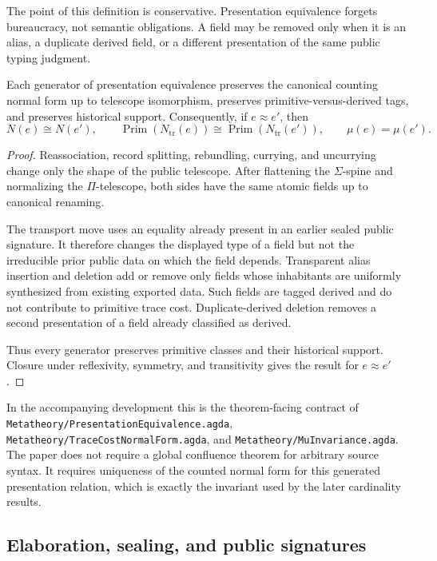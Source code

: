 The point of this definition is conservative.  Presentation equivalence forgets bureaucracy,
not semantic obligations.  A field may be removed only when it is an alias, a duplicate
derived field, or a different presentation of the same public typing judgment.

\begin{proposition}
Each generator of presentation equivalence preserves the canonical counting normal form up to
telescope isomorphism, preserves primitive-versus-derived tags, and preserves historical
support.  Consequently, if \(e\approx e'\), then
\[
  N(e) \cong N(e'),
  \qquad
  \operatorname{Prim}(N_{\mathrm{tr}}(e)) \cong
  \operatorname{Prim}(N_{\mathrm{tr}}(e')),
  \qquad
  \mu(e)=\mu(e').
\]
\end{proposition}

\begin{proof}
Reassociation, record splitting, rebundling, currying, and uncurrying change only the shape of
the public telescope.  After flattening the \(\Sigma\)-spine and normalizing the
\(\Pi\)-telescope, both sides have the same atomic fields up to canonical renaming.

The transport move uses an equality already present in an earlier sealed public signature.
It therefore changes the displayed type of a field but not the irreducible prior public data
on which the field depends.  Transparent alias insertion and deletion add or remove only
fields whose inhabitants are uniformly synthesized from existing exported data.  Such fields
are tagged derived and do not contribute to primitive trace cost.  Duplicate-derived deletion
removes a second presentation of a field already classified as derived.

Thus every generator preserves primitive classes and their historical support.  Closure under
reflexivity, symmetry, and transitivity gives the result for \(e\approx e'\).
\end{proof}

In the accompanying development this is the theorem-facing contract of
\texttt{Metatheory/PresentationEquivalence.agda},
\texttt{Metatheory/TraceCostNormalForm.agda}, and
\texttt{Metatheory/MuInvariance.agda}.  The paper does not require a global confluence
theorem for arbitrary source syntax.  It requires uniqueness of the counted normal form for
this generated presentation relation, which is exactly the invariant used by the later
cardinality results.

\subsection{Elaboration, sealing, and public signatures}


